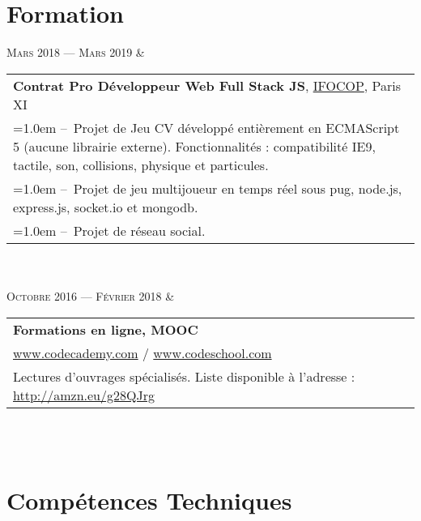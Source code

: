 \documentclass[10pt, a4paper]{article}
\begin{document}
\section{Formation}
\begin{education}
	\textsc{Mars 2018 --- Mars 2019} & \begin{tabu}{@{} X @{}}
		\textbf{Contrat Pro Développeur Web Full Stack JS}, \href{https://www.ifocop.fr}{\textsc{IFOCOP}}, Paris XI\\
	\hangindent=1.0em --~Projet de Jeu CV développé entièrement en ECMAScript 5 (aucune librairie externe). Fonctionnalités : compatibilité IE9, tactile, son, collisions, physique et particules.\\
	\hangindent=1.0em --~Projet de jeu multijoueur en temps réel sous pug, node.js, express.js, socket.io et mongodb.\\
	\hangindent=1.0em --~Projet de réseau social.
	\end{tabu}\\
	\\ [-1ex]
	\textsc{Octobre 2016 --- Février 2018} & \begin{tabu}{@{} X @{}}
		\textbf{Formations en ligne, MOOC}\\
	\href{https://www.codecademy.com}{www.codecademy.com} / \href{https://www.codeschool.com}{www.codeschool.com}\\
	Lectures d'ouvrages spécialisés. Liste disponible à l’adresse : \href{http://amzn.eu/g28QJrg}{http://amzn.eu/g28QJrg}
	\end{tabu}\\
	\\ [-1ex]
\end{education}
\vspace{-0.5cm}
\section{Compétences Techniques}
\vspace{-0.3cm}
\begin{skillslisting}
	\skills{}{\react}
	\skills{}{\jquery}
	\skills{}{\sass / \bootstrap}
	\skills{}{\git}
	\skills{}{\patterns}
	\skills{}{\python}
	\skills{}{\visb}
	\skills{}{\LaTeX}
\end{skillslisting}
\vspace{-0.6cm}
\end{document}

